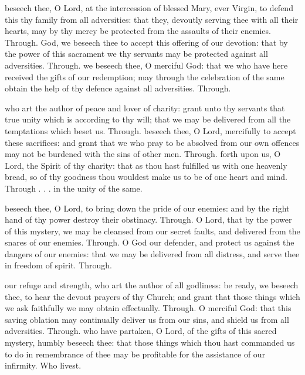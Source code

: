 \begin{multicols}{2}
 beseech thee, O Lord, at the intercession of blessed Mary, ever Virgin, to defend this thy family from all adversities: that they, devoutly serving thee with all their hearts, may by thy mercy be protected from the assaults of their enemies. Through.
 God, we beseech thee to accept this offering of our devotion: that by the power of this sacrament we thy servants may be protected against all adversities. Through.
 we beseech thee, O merciful God: that we who have here received the gifts of our redemption; may through the celebration of the same obtain the help of thy defence against all adversities. Through.

{}
 who art the author of peace and lover of charity: grant unto thy servants that true unity which is according to thy will; that we may be delivered from all the temptations which beset us. Through.
 beseech thee, O Lord, mercifully to accept these sacrifices: and grant that we who pray to be absolved from our own offences may not be burdened with the sins of other men. Through.
 forth upon us, O Lord, the Spirit of thy charity: that as thou hast fulfilled us with one heavenly bread, so of thy goodness thou wouldest make us to be of one heart and mind. Through . . . in the unity of the same.



 beseech thee, O Lord, to bring down the pride of our enemies: and by the right hand of thy power destroy their obstinacy. Through.
 O Lord, that by the power of this mystery, we may be cleansed from our secret faults, and delivered from the snares of our enemies. Through.
 O God our defender, and protect us against the dangers of our enemies: that we may be delivered from all distress, and serve thee in freedom of spirit. Through.

 our refuge and strength, who art the author of all godliness: be ready, we beseech thee, to hear the devout prayers of thy Church; and grant that those things which we ask faithfully we may obtain effectually. Through.
 O merciful God: that this saving oblation may continually deliver us from our sins, and shield us from all adversities. Through.
 who have partaken, O Lord, of the gifts of this sacred mystery, humbly beseech thee: that those things which thou hast commanded us to do in remembrance of thee may be profitable for the assistance of our infirmity. Who livest.


\end{multicols}

